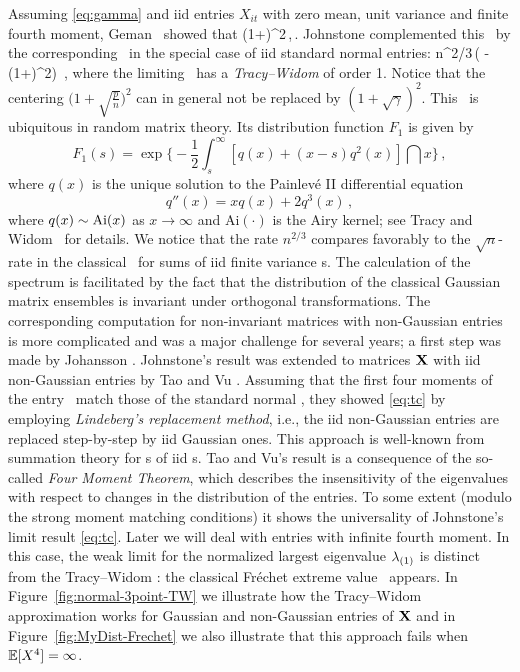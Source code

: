 Assuming \eqref{eq:gamma} and iid entries $X_{it}$ with zero mean, unit variance and finite fourth moment,  Geman~\cite{geman}
showed that
\beam\label{eq:geman}
 \stas \big(1+\sqrt{\gamma}\big)^2\,,\qquad \nto\,.
\eeam
Johnstone \cite{johnstone:2001} complemented this \slln\ by the corresponding \clt\ in the special case of iid standard normal
entries:
\beam\label{eq:tc}
 n^{2/3}\,\Big( -
\big(1+\big)^2\Big)
\,,
\eeam
where the limiting \rv\ has a {\em Tracy--Widom \ds} of order 1. Notice that the centering
$\big(1+\sqrt{\tfrac pn }\big)^2$ can in general not be replaced by $(1+\sqrt{\gamma})^2$.
This \ds\ is ubiquitous in random matrix theory.
Its distribution function $F_1$ is given by
\begin{equation*}
F_1(s) = \exp\Big\{
  -\frac{1}{2} \int_{s}^\infty [
    q(x) + (x - s) q^2(x)
 ] \dint x
\Big\}\,,
\end{equation*}
where $q(x)$ is the unique solution to the Painlev\'e II differential
equation
\begin{equation*}
  q''(x) = xq(x) + 2 q^3(x)\,,
\end{equation*}
where $ q(x)\sim {\rm Ai}(x)$ as $x \to \infty$ and Ai$(\cdot)$ is the Airy kernel; see Tracy and Widom~\cite{tracy:widom:2012} for details.
We notice that the rate $n^{2/3}$ compares favorably to the $\sqrt{n}$-rate in the classical \clt\ for sums
of iid finite variance \rv s.
The calculation of the spectrum is facilitated by the fact that the distribution of
the classical Gaussian matrix ensembles is invariant under orthogonal transformations. The corresponding
computation for non-invariant matrices with non-Gaussian entries is more complicated and was a major challenge for several years; a first step was made by Johansson \cite{johansson}.
Johnstone's result was extended to matrices ${\mathbf X}$ with iid non-Gaussian entries
by Tao and Vu \cite[Theorem~1.16]{tao09b}. Assuming that the first four moments of the entry \ds\ match  those of
the standard normal \ds , they showed \eqref{eq:tc} by
employing {\em Lindeberg's replacement method}, i.e., the iid non-Gaussian entries are replaced
step-by-step by iid Gaussian ones.
This approach is well-known from summation theory for \seq s of iid \rv s. Tao and Vu's result is a consequence of the so-called {\em Four Moment Theorem}, which describes the insensitivity of the eigenvalues with respect to changes in the distribution of the entries. To some extent (modulo the strong moment matching conditions) it shows the universality of Johnstone's limit
result \eqref{eq:tc}. Later we will deal with entries with infinite fourth moment. In this case, the weak limit
for the normalized largest eigenvalue $\lambda_{(1)}$ is distinct from the Tracy--Widom \ds : the classical Fr\'echet extreme value
\ds\ appears.
In Figure~\ref{fig:normal-3point-TW} we illustrate how the Tracy--Widom approximation works for Gaussian and non-Gaussian entries of ${\mathbf X}$
and in Figure~\ref{fig:MyDist-Frechet} we also illustrate that this approach fails when $\mathbb{E}[X^4]=\infty$.


